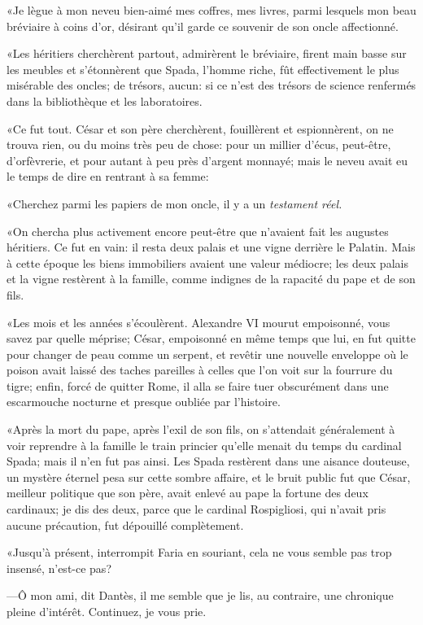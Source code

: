 «Je lègue à mon neveu bien-aimé mes coffres, mes livres, parmi lesquels mon beau bréviaire à coins d'or, désirant qu'il garde ce souvenir de son oncle affectionné.

«Les héritiers cherchèrent partout, admirèrent le bréviaire, firent main basse sur les meubles et s'étonnèrent que Spada, l'homme riche, fût effectivement le plus misérable des oncles; de trésors, aucun: si ce n'est des trésors de science renfermés dans la bibliothèque et les laboratoires.

«Ce fut tout. César et son père cherchèrent, fouillèrent et espionnèrent, on ne trouva rien, ou du moins très peu de chose: pour un millier d'écus, peut-être, d'orfèvrerie, et pour autant à peu près d'argent monnayé; mais le neveu avait eu le temps de dire en rentrant à sa femme:

«Cherchez parmi les papiers de mon oncle, il y a un \textit{testament réel.}

«On chercha plus activement encore peut-être que n'avaient fait les augustes héritiers. Ce fut en vain: il resta deux palais et une vigne derrière le Palatin. Mais à cette époque les biens immobiliers avaient une valeur médiocre; les deux palais et la vigne restèrent à la famille, comme indignes de la rapacité du pape et de son fils.

«Les mois et les années s'écoulèrent. Alexandre VI mourut empoisonné, vous savez par quelle méprise; César, empoisonné en même temps que lui, en fut quitte pour changer de peau comme un serpent, et revêtir une nouvelle enveloppe où le poison avait laissé des taches pareilles à celles que l'on voit sur la fourrure du tigre; enfin, forcé de quitter Rome, il alla se faire tuer obscurément dans une escarmouche nocturne et presque oubliée par l'histoire.

«Après la mort du pape, après l'exil de son fils, on s'attendait généralement à voir reprendre à la famille le train princier qu'elle menait du temps du cardinal Spada; mais il n'en fut pas ainsi. Les Spada restèrent dans une aisance douteuse, un mystère éternel pesa sur cette sombre affaire, et le bruit public fut que César, meilleur politique que son père, avait enlevé au pape la fortune des deux cardinaux; je dis des deux, parce que le cardinal Rospigliosi, qui n'avait pris aucune précaution, fut dépouillé complètement.

«Jusqu'à présent, interrompit Faria en souriant, cela ne vous semble pas trop insensé, n'est-ce pas?

—Ô mon ami, dit Dantès, il me semble que je lis, au contraire, une chronique pleine d'intérêt. Continuez, je vous prie.

